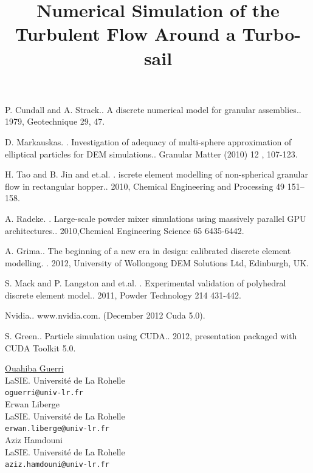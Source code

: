 \documentclass[article, A4, 11pt]{llncs}%
\begin{document}

\begin{thebibliography}{10}
{\sc P. Cundall and A. Strack.}. {A discrete numerical model for granular assemblies.}. 1979, Geotechnique 29, 47.

{\sc D. Markauskas. }. {Investigation of adequacy of multi-sphere approximation of elliptical particles for DEM simulations.}. Granular Matter (2010) 12 , 107-123.

{\sc H. Tao and B. Jin and et.al. }. {iscrete element modelling of non-spherical granular flow in rectangular hopper.}. 2010, Chemical Engineering and Processing 49 151–158.

{\sc A. Radeke. }. {Large-scale powder mixer simulations using massively parallel GPU architectures.}.  2010,Chemical Engineering Science 65 6435-6442.

{\sc A. Grima.}. {The beginning of a new era in design: calibrated discrete element modelling. }. 2012, University of Wollongong DEM Solutions Ltd, Edinburgh, UK.

{\sc S. Mack and P. Langston and et.al. }. {Experimental validation of polyhedral discrete element model.}. 2011, Powder Technology 214 431-442.

{ Nvidia.}. {www.nvidia.com}. (December 2012 Cuda 5.0).

{\sc S. Green.}. {Particle simulation using CUDA.}. 2012, presentation packaged with CUDA Toolkit 5.0.
\end{thebibliography} %

\title{Numerical Simulation of the Turbulent Flow Around a Turbo-sail}
 \author{} \institute{}
\maketitle
\begin{center}
{\large \underline{Ouahiba Guerri}}\\
LaSIE. Université de La Rohelle\\
{\tt oguerri@univ-lr.fr}
\\ \vspace{4mm}
{\large Erwan Liberge}\\
LaSIE. Université de La Rohelle\\
{\tt erwan.liberge@univ-lr.fr}
\\ \vspace{4mm}
{\large Aziz Hamdouni}\\
LaSIE. Université de La Rohelle\\
{\tt aziz.hamdouni@univ-lr.fr}
\end{center}
\end{document}
